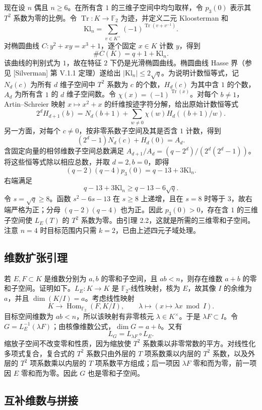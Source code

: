 \documentclass[11pt]{ctexart}
\begin{document}
现在设 $n$ 偶且 $n\ge6$。在所有含 $1$ 的三维子空间中均匀取样，令 $p_3(0)$ 表示其 $T^2$ 系数为零的比例。令 $\operatorname{Tr}:K\to\mathbb F_2$ 为迹，并定义二元 Kloosterman 和
\[
\mathrm{Kl}_n=\sum_{v\in K^\times}(-1)^{\operatorname{Tr}(v+v^{-1})}.
\]
对椭圆曲线 $C:y^2+xy=x^3+1$，逐个固定 $x\in K$ 计数 $y$，得到
\[
\#C(K)=q+1+\mathrm{Kl}_n.
\]
该曲线的判别式为 $1$，故在特征 $2$ 下仍是光滑椭圆曲线。椭圆曲线 Hasse 界（参见 [Silverman] 第 V.1.1 定理）遂给出 $|\mathrm{Kl}_n|\le2\sqrt q$。为说明计数恒等式，记 $N_d(c)$ 为所有 $d$ 维子空间中 $T^2$ 系数为 $c$ 的个数，$H_d(c)$ 为其中含 $1$ 的个数，$A_d$ 为所有含 $1$ 的 $d$ 维子空间数。令 $\chi(x)=(-1)^{\operatorname{Tr}(x)}$。对每个 $b\ne1$，Artin--Schreier 映射 $x\mapsto x^2+x$ 的纤维按迹字符分解，给出原始计数恒等式
\[
2^d H_{d+1}(b)=N_d(b+1)+\sum_{w\ne0}\chi(w)H_d((b+1)/w).
\]
另一方面，对每个 $c\ne0$，按非零系数子空间及其是否含 $1$ 计数，得到
\[
(2^d-1)N_d(c)+H_d(0)=A_d.
\]
含固定向量的相邻维数子空间总数满足 $A_{d+1}/A_d=(q-2^d)/(2^d(2^d-1))$。将这些恒等式除以相应总数，并取 $d=2,b=0$，即得
\[
(q-2)(q-4)p_3(0)=q-13+3\mathrm{Kl}_n.
\]
右端满足
\[
q-13+3\mathrm{Kl}_n\ge q-13-6\sqrt q.
\]
令 $s=\sqrt q\ge8$。函数 $s^2-6s-13$ 在 $s\ge8$ 上递增，且在 $s=8$ 时等于 $3$，故右端严格为正；分母 $(q-2)(q-4)$ 也为正。因此 $p_3(0)>0$，存在含 $1$ 的三维子空间使 $L_E(T)$ 的 $T^2$ 系数为零。由引理 2.2，这就是所需的三维零和子空间。注意 $n=4$ 时目标范围内只需 $k=2$，已由上述四元子域处理。

\subsection{维数扩张引理}

若 $E,F\subset K$ 是维数分别为 $a,b$ 的零和子空间，且 $ab<n$，则存在维数 $a+b$ 的零和子空间。证明如下。$L_E:K\to K$ 是 $\mathbb F_2$-线性映射，核为 $E$，故其像 $I$ 的余维为 $a$，并且 $\dim(K/I)=a$。考虑线性映射
\[
K\longrightarrow\operatorname{Hom}_{\mathbb F_2}(F,K/I),\qquad
\lambda\longmapsto (x\mapsto \lambda x\bmod I).
\]
目标空间维数为 $ab<n$，所以该映射有非零核元 $\lambda\in K^\times$。于是 $\lambda F\subset I$。令 $G=L_E^{-1}(\lambda F)$；由核像维数公式，$\dim G=a+b$。又有
\[
L_G=L_{\lambda F}\circ L_E.
\]
缩放子空间不改变零和性质，因为缩放使 $T^2$ 系数乘以非零常数的平方。对线性化多项式复合，复合式的 $T^2$ 系数只由外层的 $T$ 项系数乘以内层的 $T^2$ 系数，以及外层的 $T^2$ 项系数乘以内层的 $T$ 项系数平方组成；后一项因 $\lambda F$ 零和而为零，前一项因 $E$ 零和而为零。因此 $G$ 也是零和子空间。

\subsection{互补维数与拼接}
\end{document}
